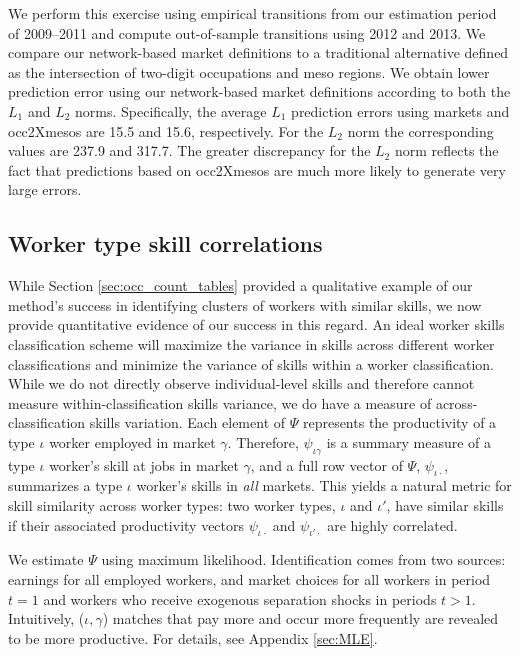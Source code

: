 \documentclass[12pt]{article}
\def\ig{\iota\gamma}
\def\g{\gamma}
\def\i{\iota}
\theoremstyle{definition}
\theoremstyle{plain}
\begin{document}
We perform this exercise using empirical transitions from our estimation period of 2009--2011 and compute out-of-sample transitions using 2012 and 2013. We compare our network-based market definitions to a traditional alternative defined as the intersection of two-digit occupations and meso regions. We obtain lower prediction error using our network-based market definitions according to both the $L_1$ and $L_2$ norms. Specifically, the average $L_1$ prediction errors using markets and occ2Xmesos are 15.5 and 15.6, respectively. For the  $L_2$ norm the corresponding values are 237.9 and 317.7. The greater discrepancy for the  $L_2$ norm reflects the fact that predictions based on occ2Xmesos are much more likely to generate very large errors. 




\subsection{Worker type skill correlations}

\label{sec:correlograms}



While Section \ref{sec:occ_count_tables} provided a qualitative example of our method's success in identifying clusters of workers with similar skills, we now provide quantitative evidence of our success in this regard. An ideal worker skills classification scheme will maximize the variance in skills across different worker classifications and minimize the variance of skills within a worker classification. While we do not directly observe individual-level skills and therefore cannot measure within-classification skills variance, we do have a measure of across-classification skills variation. Each element of $\Psi$ represents the productivity of a type $\i$ worker employed in market $\g$. Therefore, $\psi_{\ig}$ is a summary measure of a type $\i$ worker's skill at jobs in market $\g$, and a full row vector of $\Psi$, $\psi_{\i\cdot}$, summarizes a type $\i$ worker's skills in \emph{all} markets. This yields a natural metric for skill similarity across worker types: two worker types, $\i$ and $\i'$, have similar skills if their associated productivity vectors $\psi_{\i\cdot}$ and $\psi_{\i'\cdot}$ are highly correlated.


We estimate $\Psi$ using maximum likelihood. Identification comes from two sources: earnings for all employed workers, and market choices for all workers in period $t=1$ and workers who receive exogenous separation shocks in periods $t>1$. Intuitively, ($\i,\g$) matches that pay more and occur more frequently are revealed to be more productive. For details, see Appendix \ref{sec:MLE}.
\end{document}
